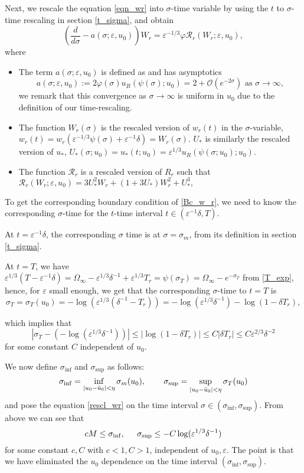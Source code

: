 \documentclass[letterpaper,11pt]{article}
\newcommand{\Ral}{\mathcal{R}}
\newcommand{\rmO}{\mathcal{O}}
\newcommand{\eps}{\varepsilon}
\numberwithin{equation}{section}
\theoremstyle{plain}
\begin{document}
Next, we rescale the equation \eqref{eqn_wr} into $\sigma$-time variable by using the $t$ to $\sigma$-time rescaling in section \ref{t_sigma}, and obtain
\begin{equation}\label{rescl_wr}
\left(\frac{d}{d\sigma} - a(\sigma; \eps, u_0)\right) W_r =\eps^{-1/3}\varphi \mathcal{R}_r(W_r; \eps,u_0),
\end{equation}
where
\begin{itemize}
\item The term $a(\sigma;\eps, u_0)$ is defined as and has asymptotics
\[
a(\sigma; \eps, u_0) := 2\varphi(\sigma)u_R(\psi(\sigma); u_0) =  2+\rmO(e^{-2\sigma}) \text{ as }\sigma \to \infty,
\]
we remark that this convergence as $\sigma \to \infty$ is uniform in $u_0$ due to the definition of our time-rescaling.

\item The function $W_r(\sigma)$ is the rescaled version of $w_r(t)$ in the $\sigma$-variable, $w_r(t) = w_r(\eps^{-1/3}\psi(\sigma)+\eps^{-1}\delta) = W_r(\sigma)$. $U_*$ is similarly the rescaled version of $u_*$,  $U_*(\sigma;u_0)= u_*(t;u_0) = \eps^{1/3}u_R(\psi(\sigma;u_0);u_0)$.

\item The function $\Ral_r$ is a rescaled version of $R_r$ such that $\mathcal{R}_r(W_r;\eps,u_0) = 3U_*^2W_r + (1+3U_*)W_r^2 + U_*^3,$ 
\end{itemize}
 

To get the corresponding boundary condition of \ref{Bc_w_r}, we need to know the corresponding $\sigma$-time for the $t$-time interval $t\in (\eps^{-1}\delta, T)$.

At $t = \eps^{-1}\delta$, the corresponding $\sigma$ time is at $\sigma=\sigma_m$, from its definition in section \ref{t_sigma}.

At $t=T$, we have $\eps^{1/3}(T-\eps^{-1}\delta) = \Omega_\infty -\eps^{1/3}\delta^{-1}+\eps^{1/3}T_r=\psi(\sigma_T) = \Omega_\infty-e^{-\sigma_T}$ from \eqref{T_exp}, hence, for $\eps$ small enough, we get that the corresponding $\sigma$-time to $t=T$ is 
\[
\sigma_T=\sigma_T(u_0)= -\log(\eps^{1/3}(\delta^{-1}-T_r)) = -\log(\eps^{1/3}\delta^{-1}) - \log(1-\delta T_r),
\]

which implies that 
\[
|\sigma_T -(-\log(\eps^{1/3}\delta^{-1}))| \le |\log(1-\delta T_r)| \le  C|\delta T_r|\le C\eps^{2/3}\delta^{-2}
 \] 
for some constant $C$ independent of $u_0$.

We now define $\sigma_{\inf}$ and $\sigma_{\sup}$ as follows:
\[
\sigma_{\inf} = \inf_{|u_0-\bar{u}_0|<\eta}\sigma_m(u_0), \hspace{0.3in} \sigma_{\sup} = \sup_{|u_0-\bar{u}_0|<\eta}\sigma_T(u_0)
\]
and pose the equation \eqref{rescl_wr} on the time interval $\sigma \in (\sigma_{\inf}, \sigma_{\sup})$. From above we can see that 
\[
cM \le \sigma_{\inf} , \hspace{0.2in} \sigma_{\sup} \le -C\log(\eps^{1/3}\delta^{-1})\] for some constant $c,C$ with $c<1, C>1$, independent of $u_0,\eps$. The point is that we have eliminated the $u_0$ dependence on the time interval $(\sigma_{\inf}, \sigma_{\sup})$.
\end{document}
